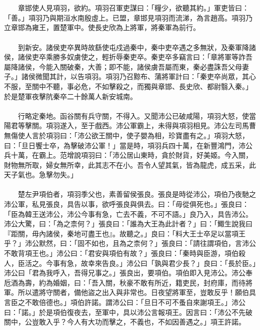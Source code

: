 \\\\
　　章邯使人見項羽，欲約。項羽召軍吏謀曰：「糧少，欲聽其約。」軍吏皆曰：「善。」項羽乃與期洹水南殷虛上。已盟，章邯見項羽而流涕，為言趙高。項羽乃立章邯為雍王，置楚軍中。使長史欣為上將軍，將秦軍為前行。
\\\\
　　到新安。諸侯吏卒異時故繇使屯戍過秦中，秦中吏卒遇之多無狀，及秦軍降諸侯，諸侯吏卒乘勝多奴虜使之，輕折辱秦吏卒。秦吏卒多竊言曰：「章將軍等詐吾屬降諸侯，今能入關破秦，大善；即不能，諸侯虜吾屬而東，秦必盡誅吾父母妻子。」諸侯微聞其計，以告項羽。項羽乃召黥布、蒲將軍計曰：「秦吏卒尚眾，其心不服，至關中不聽，事必危，不如擊殺之，而獨與章邯、長史欣、都尉翳入秦。」於是楚軍夜擊阬秦卒二十餘萬人新安城南。
\\\\
　　行略定秦地。函谷關有兵守關，不得入。又聞沛公已破咸陽，項羽大怒，使當陽君等擊關。項羽遂入，至于戲西。沛公軍霸上，未得與項羽相見。沛公左司馬曹無傷使人言於項羽曰：「沛公欲王關中，使子嬰為相，珍寶盡有之。」項羽大怒，曰：「旦日饗士卒，為擊破沛公軍！」當是時，項羽兵四十萬，在新豐鴻門，沛公兵十萬，在霸上。范增說項羽曰：「沛公居山東時，貪於財貨，好美姬。今入關，財物無所取，婦女無所幸，此其志不在小。吾令人望其氣，皆為龍虎，成五采，此天子氣也。急擊勿失。」
\\\\
　　楚左尹項伯者，項羽季父也，素善留侯張良。張良是時從沛公，項伯乃夜馳之沛公軍，私見張良，具告以事，欲呼張良與俱去。曰：「毋從俱死也。」張良曰：「臣為韓王送沛公，沛公今事有急，亡去不義，不可不語。」良乃入，具告沛公。沛公大驚，曰：「為之柰何？」張良曰：「誰為大王為此計者？」曰：「鯫生說我曰『距關，毋內諸侯，秦地可盡王也』。故聽之。」良曰：「料大王士卒足以當項王乎？」沛公默然，曰：「固不如也，且為之柰何？」張良曰：「請往謂項伯，言沛公不敢背項王也。」沛公曰：「君安與項伯有故？」張良曰：「秦時與臣游，項伯殺人，臣活之。今事有急，故幸來告良。」沛公曰「孰與君少長？」良曰：「長於臣。」沛公曰「君為我呼入，吾得兄事之。」張良出，要項伯。項伯即入見沛公。沛公奉卮酒為壽，約為婚姻，曰：「吾入關，秋豪不敢有所近，籍吏民，封府庫，而待將軍。所以遣將守關者，備他盜之出入與非常也。日夜望將軍至，豈敢反乎！願伯具言臣之不敢倍德也。」項伯許諾。謂沛公曰：「旦日不可不蚤自來謝項王。」沛公曰：「諾。」於是項伯復夜去，至軍中，具以沛公言報項王。因言曰：「沛公不先破關中，公豈敢入乎？今人有大功而擊之，不義也，不如因善遇之。」項王許諾。
\\\\
